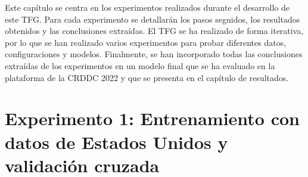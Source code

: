 Este capítulo se centra en los experimentos realizados durante el desarrollo de este TFG. Para cada experimento se detallarán los pasos seguidos, los resultados obtenidos y las conclusiones extraídas. El TFG se ha realizado de forma iterativa, por lo que se han realizado varios experimentos para probar diferentes datos, configuraciones y modelos. Finalmente, se han incorporado todas las conclusiones extraídas de los experimentos en un modelo final que se ha evaluado en la plataforma de la CRDDC 2022 y que se presenta en el capítulo de resultados.

\section{Experimento 1: Entrenamiento con datos de Estados Unidos y validación cruzada}